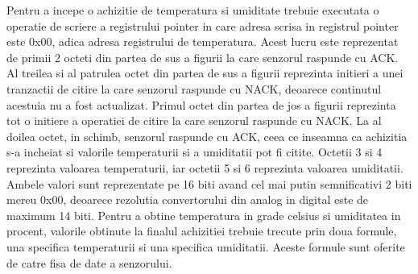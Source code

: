 Pentru a incepe o achizitie de temperatura si umiditate trebuie executata o operatie de scriere a registrului pointer in care adresa scrisa in registrul pointer este 
0x00, adica adresa registrului de temperatura. Acest lucru este reprezentat de primii 2 octeti din partea de sus a figurii la care senzorul raspunde cu ACK. Al treilea 
si al patrulea octet din partea de sus a figurii reprezinta initieri a unei tranzactii de citire la care senzorul raspunde cu NACK, deoarece continutul acestuia nu a 
fost actualizat. Primul octet din partea de jos a figurii reprezinta tot o initiere a operatiei de citire la care senzorul raspunde cu NACK. La al doilea octet, in schimb, 
senzorul raspunde cu ACK, ceea ce inseamna ca achizitia s-a incheiat si valorile temperaturii si a umiditatii pot fi citite. Octetii 3 si 4 reprezinta valoarea 
temperaturii, iar octetii 5 si 6 reprezinta valoarea umiditatii. Ambele valori sunt reprezentate pe 16 biti avand cel mai putin semnificativi 2 biti mereu 0x00, 
deoarece rezolutia convertorului din analog in digital este de maximum 14 biti. Pentru a obtine temperatura in grade celsius si umiditatea in procent, valorile 
obtinute la finalul achizitiei trebuie trecute prin doua formule, una specifica temperaturii si una specifica umiditatii. Aceste formule sunt oferite de catre 
fisa de date a senzorului.
